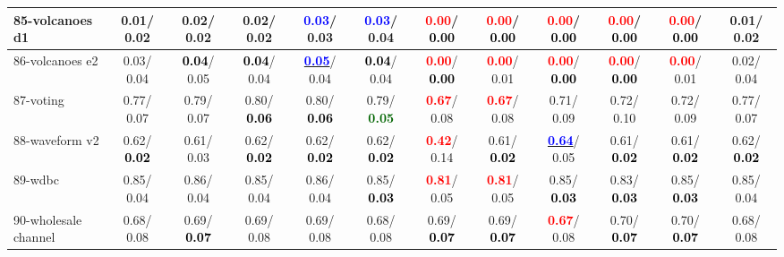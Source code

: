 \begin{table}[h]
\begin{center}
{\begin{tabular}{lc|c|c|c|c|c|c|c|c|c|c}
85-volcanoes d1 &   0.01/  0.02 &   0.02/  0.02 &   0.02/  0.02 & \textcolor{blue}{\textbf{  0.03}}/  0.03 & \textcolor{blue}{\textbf{  0.03}}/  0.04 & \textcolor{red}{\textbf{  0.00}}/\textcolor{black}{\textbf{  0.00}} & \textcolor{red}{\textbf{  0.00}}/\textcolor{black}{\textbf{  0.00}} & \textcolor{red}{\textbf{  0.00}}/\textcolor{black}{\textbf{  0.00}} & \textcolor{red}{\textbf{  0.00}}/\textcolor{black}{\textbf{  0.00}} & \textcolor{red}{\textbf{  0.00}}/\textcolor{black}{\textbf{  0.00}} &   0.01/  0.02 \\ \hline
86-volcanoes e2 &   0.03/  0.04 & \textcolor{black}{\textbf{  0.04}}/  0.05 & \textcolor{black}{\textbf{  0.04}}/  0.04 & \underline{\textcolor{blue}{\textbf{  0.05}}}/  0.04 & \textcolor{black}{\textbf{  0.04}}/  0.04 & \textcolor{red}{\textbf{  0.00}}/\textcolor{black}{\textbf{  0.00}} & \textcolor{red}{\textbf{  0.00}}/  0.01 & \textcolor{red}{\textbf{  0.00}}/\textcolor{black}{\textbf{  0.00}} & \textcolor{red}{\textbf{  0.00}}/\textcolor{black}{\textbf{  0.00}} & \textcolor{red}{\textbf{  0.00}}/  0.01 &   0.02/  0.04 \\
87-voting &   0.77/  0.07 &   0.79/  0.07 &   0.80/\textcolor{black}{\textbf{  0.06}} &   0.80/\textcolor{black}{\textbf{  0.06}} &   0.79/\textcolor{darkgreen}{\textbf{  0.05}} & \textcolor{red}{\textbf{  0.67}}/  0.08 & \textcolor{red}{\textbf{  0.67}}/  0.08 &   0.71/  0.09 &   0.72/  0.10 &   0.72/  0.09 &   0.77/  0.07 \\
88-waveform v2 &   0.62/\textcolor{black}{\textbf{  0.02}} &   0.61/  0.03 &   0.62/\textcolor{black}{\textbf{  0.02}} &   0.62/\textcolor{black}{\textbf{  0.02}} &   0.62/\textcolor{black}{\textbf{  0.02}} & \textcolor{red}{\textbf{  0.42}}/  0.14 &   0.61/\textcolor{black}{\textbf{  0.02}} & \underline{\textcolor{blue}{\textbf{  0.64}}}/  0.05 &   0.61/\textcolor{black}{\textbf{  0.02}} &   0.61/\textcolor{black}{\textbf{  0.02}} &   0.62/\textcolor{black}{\textbf{  0.02}} \\
89-wdbc &   0.85/  0.04 &   0.86/  0.04 &   0.85/  0.04 &   0.86/  0.04 &   0.85/\textcolor{black}{\textbf{  0.03}} & \textcolor{red}{\textbf{  0.81}}/  0.05 & \textcolor{red}{\textbf{  0.81}}/  0.05 &   0.85/\textcolor{black}{\textbf{  0.03}} &   0.83/\textcolor{black}{\textbf{  0.03}} &   0.85/\textcolor{black}{\textbf{  0.03}} &   0.85/  0.04 \\
90-wholesale channel &   0.68/  0.08 &   0.69/\textcolor{black}{\textbf{  0.07}} &   0.69/  0.08 &   0.69/  0.08 &   0.68/  0.08 &   0.69/\textcolor{black}{\textbf{  0.07}} &   0.69/\textcolor{black}{\textbf{  0.07}} & \textcolor{red}{\textbf{  0.67}}/  0.08 &   0.70/\textcolor{black}{\textbf{  0.07}} &   0.70/\textcolor{black}{\textbf{  0.07}} &   0.68/  0.08 \\

\end{tabular}}
\end{center}
\end{table}
